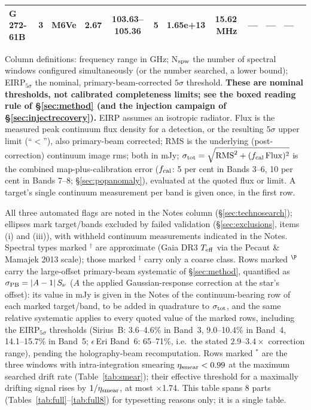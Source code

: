 \documentclass{openjournal}
\begin{document}
\begin{table}
\begin{tabularx}{\textwidth}{@{}l c c c c c c c c c c X@{}}
 G 272-61B & 3 & M6Ve & 2.67 & 103.63--105.36 & 5 & 1.65e+13 & 15.62\,MHz & --- & --- & --- &  \\
\hline
\end{tabularx}
\par\vspace{3pt}
\parbox{\textwidth}{\footnotesize Column definitions:
frequency range in GHz; N$_{\rm spw}$ the number of spectral windows
configured simultaneously (or the number searched, a lower bound);
EIRP$_{5\sigma}$ the nominal, primary-beam-corrected $5\sigma$
threshold. \textbf{These are nominal thresholds, not calibrated
completeness limits; see the boxed reading rule of \S\ref{sec:method}
(and the injection campaign of \S\ref{sec:injectrecovery}).} EIRP assumes an
isotropic radiator. Flux is the measured peak continuum flux density
for a detection, or the resulting $5\sigma$ upper limit (``$<$''),
also primary-beam corrected; RMS is the underlying (post-correction)
continuum image rms; both in mJy;
$\sigma_{\rm tot} = \sqrt{\mathrm{RMS}^{2} + (f_{\rm cal}\,
\mathrm{Flux})^{2}}$ is the combined map-plus-calibration error
($f_{\rm cal}$: 5 per cent in Bands 3--6, 10 per cent in Bands 7--8;
\S\ref{sec:popanomaly}), evaluated at the quoted flux or limit. A
target's single continuum measurement per band is given once, in the
first row.}

\parbox{\textwidth}{\footnotesize All three automated flags are
noted in the Notes column (\S\ref{sec:technosearch}); ellipses mark
target/bands excluded by failed validation (\S\ref{sec:exclusions},
items (i) and (iii)), with withheld continuum measurements indicated
in the Notes. Spectral types marked $^\dagger$ are approximate (Gaia
DR3 $T_{\rm eff}$ via the Pecaut \& Mamajek 2013 scale); those marked
$^\ddagger$ carry only a coarse class. Rows marked $^{\P}$ carry the
large-offset primary-beam systematic of \S\ref{sec:method}, quantified
as $\sigma_{\rm PB} = |A-1|\,S_\nu$ ($A$ the applied Gaussian-response
correction at the star's offset): its value in mJy is given in the
Notes of the continuum-bearing row of each marked target/band, to be
added in quadrature to $\sigma_{\rm tot}$, and the
same relative systematic applies to every quoted value of the marked
rows, including the EIRP$_{5\sigma}$ thresholds (Sirius~B: 3.6--4.6\%
in Band~3, 9.0--10.4\% in Band~4, 14.1--15.7\% in Band~5;
$\epsilon$\,Eri Band~6: 65--71\%, i.e.\ the stated $2.9$--$3.4\times$
correction range), pending the holography-beam recomputation. Rows marked
$^{\ast}$ are the three windows with intra-integration smearing
$\eta_{\rm smear}<0.99$ at the maximum searched drift rate
(Table~\ref{tab:smear}); their effective threshold for a maximally
drifting signal rises by $1/\eta_{\rm smear}$, at most $\times$1.74.
This table spans 8 parts (Tables~\ref{tab:full}--\ref{tab:full8})
for typesetting reasons only; it is a single table.}
\end{table}
\end{document}
